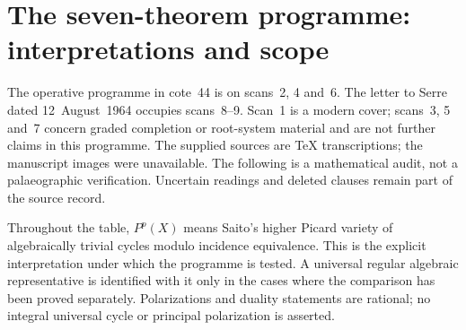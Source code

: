 
\section{The seven-theorem programme: interpretations and scope}
\label{sec:programme-overview}

The operative programme in cote~44 is on scans~2, 4 and~6.
The letter to Serre dated 12~August~1964 occupies scans~8--9.
Scan~1 is a modern cover; scans~3, 5 and~7 concern graded
completion or root-system material and are not further claims in
this programme. The supplied sources are TeX transcriptions;
the manuscript images were unavailable. The following is a
mathematical audit, not a palaeographic verification. Uncertain
readings and deleted clauses remain part of the source record.

Throughout the table, $P^p(X)$ means Saito's higher Picard variety
of algebraically trivial cycles modulo incidence equivalence.
This is the explicit interpretation under which the programme is
tested. A universal regular algebraic representative is identified
with it only in the cases where the comparison has been proved
separately. Polarizations and duality statements are rational;
no integral universal cycle or principal polarization is asserted.

